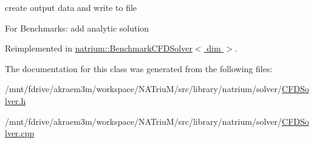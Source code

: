 create output data and write to file 

For Benchmarks: add analytic solution 

Reimplemented in \hyperlink{classnatrium_1_1BenchmarkCFDSolver_a9708132fc0cef4ae55e3453672891c81}{natrium::BenchmarkCFDSolver$<$ dim $>$}.

The documentation for this class was generated from the following files:\begin{DoxyCompactItemize}
\item 
/mnt/fdrive/akraem3m/workspace/NATriuM/src/library/natrium/solver/\hyperlink{CFDSolver_8h}{CFDSolver.h}\item 
/mnt/fdrive/akraem3m/workspace/NATriuM/src/library/natrium/solver/\hyperlink{CFDSolver_8cpp}{CFDSolver.cpp}\end{DoxyCompactItemize}

